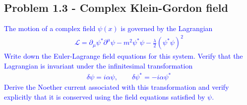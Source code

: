 \documentclass[../main.tex]{subfiles}
\begin{document}
\subsection{Problem 1.3 - Complex Klein-Gordon field}

\textcolor{blue}{
The motion of a complex field $\psi(x)$ is governed by the Lagrangian
\begin{align}
\mathcal{L}=\partial_\mu\psi^*\partial^\mu\psi-m^2\psi^*\psi-\frac{\lambda}{2}(\psi^*\psi)^2
\end{align}
Write down the Euler-Lagrange field equations for this system. Verify that the Lagrangian is invariant under the infinitesimal transformation
\begin{align}
\delta\psi=i\alpha\psi,\qquad\delta\psi^*=-i\alpha\psi^*
\end{align}
Derive the Noether current associated with this transformation and verify explicitly that it is conserved using the field equations satisfied by $\psi$.
}\newline
\end{document}
